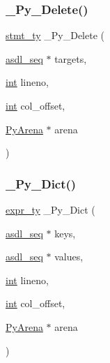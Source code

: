 \subsubsection{\texorpdfstring{\_Py\_Delete()}{\_Py\_Delete()}}
{\footnotesize\ttfamily \mbox{\hyperlink{_python-ast_8h_a39618071027b661bc03e8916e664e1a7}{stmt\+\_\+ty}} \+\_\+\+Py\+\_\+\+Delete (\begin{DoxyParamCaption}\item[{\mbox{\hyperlink{structasdl__seq}{asdl\+\_\+seq}} $\ast$}]{targets,  }\item[{\mbox{\hyperlink{warnings_8h_a74f207b5aa4ba51c3a2ad59b219a423b}{int}}}]{lineno,  }\item[{\mbox{\hyperlink{warnings_8h_a74f207b5aa4ba51c3a2ad59b219a423b}{int}}}]{col\+\_\+offset,  }\item[{\mbox{\hyperlink{pyarena_8h_a9edeb357fbb27333471022a0975adb7a}{Py\+Arena}} $\ast$}]{arena }\end{DoxyParamCaption})}

\mbox{\label{_python-ast_8h_a9c9d41ca778cf10d746e215dcb75c978}} 
\subsubsection{\texorpdfstring{\_Py\_Dict()}{\_Py\_Dict()}}
{\footnotesize\ttfamily \mbox{\hyperlink{_python-ast_8h_a56d3705e020a071405094a220c4592bd}{expr\+\_\+ty}} \+\_\+\+Py\+\_\+\+Dict (\begin{DoxyParamCaption}\item[{\mbox{\hyperlink{structasdl__seq}{asdl\+\_\+seq}} $\ast$}]{keys,  }\item[{\mbox{\hyperlink{structasdl__seq}{asdl\+\_\+seq}} $\ast$}]{values,  }\item[{\mbox{\hyperlink{warnings_8h_a74f207b5aa4ba51c3a2ad59b219a423b}{int}}}]{lineno,  }\item[{\mbox{\hyperlink{warnings_8h_a74f207b5aa4ba51c3a2ad59b219a423b}{int}}}]{col\+\_\+offset,  }\item[{\mbox{\hyperlink{pyarena_8h_a9edeb357fbb27333471022a0975adb7a}{Py\+Arena}} $\ast$}]{arena }\end{DoxyParamCaption})}

\mbox{\label{_python-ast_8h_a221e34772c12c38d3e2b230bf2c20471}} 
